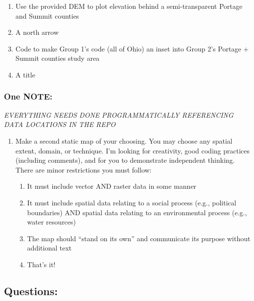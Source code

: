 \documentclass[]{article}
\providecommand{\tightlist}{%
  \setlength{\itemsep}{0pt}\setlength{\parskip}{0pt}}
\begin{document}
\begin{enumerate}
\def\labelenumi{\arabic{enumi}.}
\tightlist
\item
  Use the provided DEM to plot elevation behind a semi-transparent
  Portage and Summit counties
\item
  A north arrow
\item
  Code to make Group 1's code (all of Ohio) an inset into Group 2's
  Portage + Summit counties study area
\item
  A title
\end{enumerate}

\subsubsection{One NOTE:}\label{one-note}

\emph{EVERYTHING NEEDS DONE PROGRAMMATICALLY REFERENCING DATA LOCATIONS
IN THE REPO}

\begin{enumerate}
\def\labelenumi{\arabic{enumi}.}
\setcounter{enumi}{1}
\tightlist
\item
  Make a second static map of your choosing. You may choose any spatial
  extent, domain, or technique. I'm looking for creativity, good coding
  practices (including comments), and for you to demonstrate independent
  thinking. There are minor restrictions you must follow:

  \begin{enumerate}
  \def\labelenumii{\arabic{enumii}.}
  \tightlist
  \item
    It must include vector AND raster data in some manner
  \item
    It must include spatial data relating to a social process (e.g.,
    political boundaries) AND spatial data relating to an environmental
    process (e.g., water resources)
  \item
    The map should ``stand on its own'' and communicate its purpose
    without additional text
  \item
    That's it!
  \end{enumerate}
\end{enumerate}

\subsection{Questions:}\label{questions}
\end{document}
